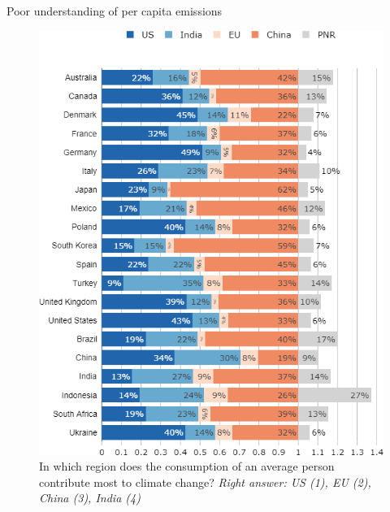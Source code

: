 \begin{frame}{Poor understanding of per capita emissions}%
\begin{figure}[h!]
\centering
\caption{In which region does the consumption of an average person contribute most to climate change?
\newline \footnotesize{\textit{Right answer: US (1), EU (2), China (3), India (4)}}} %
\vspace{-0.2cm}
\includegraphics[height=.8\paperheight]{../figures/country_comparison/footprint_pc_countries_most.png}
\end{figure}
\end{frame}
	
